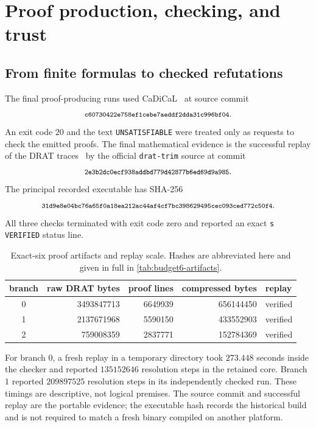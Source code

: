 \section{Proof production, checking, and trust}\label{sec:certification}

\subsection{From finite formulas to checked refutations}

The final proof-producing runs used CaDiCaL~\cite{Biere2024} at source commit
\[
\sha{c60730422e758ef1cebe7aeddf2dda31c996bf04}.
\]
An exit code \(20\) and the text \texttt{UNSATISFIABLE} were treated only as
requests to check the emitted proofs.  The final mathematical evidence is the
successful replay of the DRAT traces~\cite{Wetzler2014,Heule2016} by the
official \texttt{drat-trim} source at commit
\[
\sha{2e3b2dc0ecf938addbd779d42877b6ed69d9a985}.
\]
The principal recorded executable has SHA-256
\[
\sha{31d9e8e04bc76a65f0a18ea212ac44af4cf7bc398629495cec093ced772c50f4}.
\]
All three checks terminated with exit code zero and reported an exact
\texttt{s VERIFIED} status line.

\begin{table}[t]
\centering
\caption{Exact-six proof artifacts and replay scale.  Hashes are abbreviated
here and given in full in \cref{tab:budget6-artifacts}.}\label{tab:proof-scale}
\begin{tabular}{@{}crrrl@{}}
\toprule
branch & raw DRAT bytes & proof lines & compressed bytes & replay\\
\midrule
0 & 3493847713 & 6649939 & 656144450 & verified\\
1 & 2137671968 & 5590150 & 433552903 & verified\\
2 &  759008359 & 2837771 & 152784369 & verified\\
\bottomrule
\end{tabular}
\end{table}

For branch \(0\), a fresh replay in a temporary directory took \(273.448\)
seconds inside the checker and reported \(135152646\) resolution steps in
the retained core.  Branch \(1\) reported \(209897525\) resolution steps in
its independently checked run.  These timings are descriptive, not logical
premises.  The source commit and successful replay are the portable evidence;
the executable hash records the historical build and is not required to match
a fresh binary compiled on another platform.

